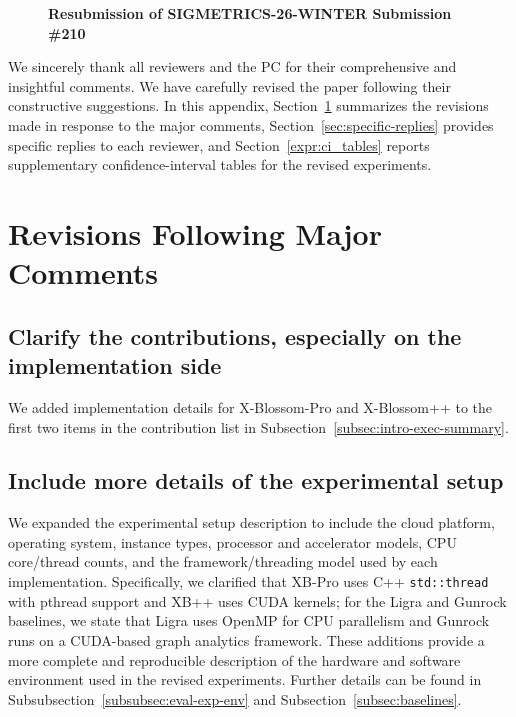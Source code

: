 \begin{figure}[h]
  \centering
  {\Large\bfseries\sffamily Resubmission of SIGMETRICS-26-WINTER Submission \#210}
\end{figure}

We sincerely thank all reviewers and the PC for their comprehensive and insightful comments.
We have carefully revised the paper following their constructive suggestions.
In this appendix, Section~\ref{sec:major-revisions} summarizes the revisions made in response to the major comments, Section~\ref{sec:specific-replies} provides specific replies to each reviewer, and Section~\ref{expr:ci_tables} reports supplementary confidence-interval tables for the revised experiments.

\section{Revisions Following Major Comments}
\label{sec:major-revisions}

\subsection{Clarify the contributions, especially on the implementation side}
\label{subsec:rev-contributions}
We added implementation details for X-Blossom-Pro and X-Blossom++ to the first two items in the contribution list in Subsection~\ref{subsec:intro-exec-summary}.

\subsection{Include more details of the experimental setup}
\label{subsec:rev-exp-setup}
We expanded the experimental setup description to include the cloud platform, operating system, instance types, processor and accelerator models, CPU core/thread counts, and the framework/threading model used by each implementation. 
Specifically, we clarified that XB-Pro uses C++ \texttt{std::thread} with pthread support and XB++ uses CUDA kernels; for the Ligra and Gunrock baselines, we state that Ligra uses OpenMP for CPU parallelism and Gunrock runs on a CUDA-based graph analytics framework.
These additions provide a more complete and reproducible description of the hardware and software environment used in the revised experiments. Further details can be found in Subsubsection~\ref{subsubsec:eval-exp-env} and Subsection~\ref{subsec:baselines}.

